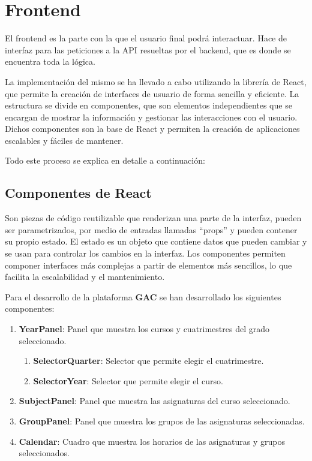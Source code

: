 \section{Frontend}

El frontend es la parte con la que el usuario final podrá interactuar. Hace de interfaz para las peticiones a la API resueltas por el backend, que es donde se encuentra toda la lógica.\newline

La implementación del mismo se ha llevado a cabo utilizando la librería de React, que permite la creación de interfaces de usuario de forma sencilla y eficiente. La estructura se divide en componentes, que son elementos independientes que se encargan de mostrar la información y gestionar las interacciones con el usuario. Dichos componentes son la base de React y permiten la creación de aplicaciones escalables y fáciles de mantener.\newline

Todo este proceso se explica en detalle a continuación:\newline

\subsection{Componentes de React}

Son piezas de código reutilizable que renderizan una parte de la interfaz, pueden ser parametrizados, por medio de entradas llamadas ``props'' y pueden contener su propio estado. El estado es un objeto que contiene datos que pueden cambiar y se usan para controlar los cambios en la interfaz. Los componentes permiten componer interfaces más complejas a partir de elementos más sencillos, lo que facilita la escalabilidad y el mantenimiento.\newline


Para el desarrollo de la plataforma \textbf{GAC} se han desarrollado los siguientes componentes:

\begin{enumerate}
    \item \textbf{YearPanel}: Panel que muestra los cursos y cuatrimestres del grado seleccionado.
    \begin{enumerate}
        \item \textbf{SelectorQuarter}: Selector que permite elegir el cuatrimestre.
        \item \textbf{SelectorYear}: Selector que permite elegir el curso.
    \end{enumerate}
    \item \textbf{SubjectPanel}: Panel que muestra las asignaturas del curso seleccionado.
    \item \textbf{GroupPanel}: Panel que muestra los grupos de las asignaturas seleccionadas.
    \item \textbf{Calendar}: Cuadro que muestra los horarios de las asignaturas y grupos seleccionados.
\end{enumerate}

